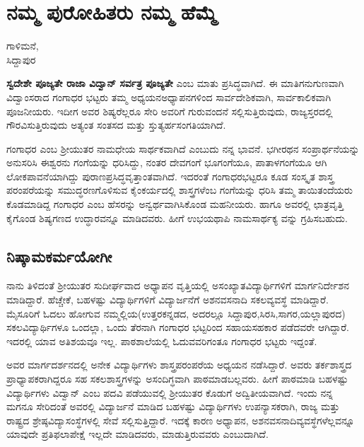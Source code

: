 {\fontsize{14}{16}\selectfont
\chapter{ನಮ್ಮ ಪುರೋಹಿತರು   \enginline{-}   ನಮ್ಮ ಹೆಮ್ಮೆ}

\begin{center}
\smallskip

ಗಾಳಿಮನೆ,\\ 
ಸಿದ್ದಾಪುರ	
\addrule
\end{center}

\textbf{ಸ್ವದೇಶೇ ಪೂಜ್ಯತೇ ರಾಜಾ ವಿದ್ವಾನ್ ಸರ್ವತ್ರ ಪೂಜ್ಯತೇ} ಎಂಬ ಮಾತು ಪ್ರಸಿದ್ಧ\-ವಾಗಿದೆ. ಈ ಮಾತಿಗನುಗುಣವಾಗಿ ವಿದ್ವಾಂಸರಾದ ಗಂಗಾಧರ ಭಟ್ಟರು ತಮ್ಮ ಅಧ್ಯಯನ\enginline{-}ಅಧ್ಯಾಪನಗಳಿಂದ ಸಾರ್ವದೇಶಿಕವಾಗಿ, ಸಾರ್ವಕಾಲಿಕವಾಗಿ ಪೂಜನೀಯರು. ಇದೀಗ ಅವರ ಶಿಷ್ಯರೆಲ್ಲರೂ ಸೇರಿ ಅವರಿಗೆ ಗುರುವಂದನೆ ಸಲ್ಲಿಸುತ್ತಿರುವುದು, ರಾಜ್ಯ\-ಸ್ತರದಲ್ಲಿ ಗೌರವಿಸುತ್ತಿರುವುದು ಅತ್ಯಂತ ಸಂತಸದ ಮತ್ತು ಸ್ತುತ್ಯರ್ಹಸಂಗತಿಯಾಗಿದೆ. 

ಗಂಗಾಧರ ಎಂಬ ಶ್ರೀಯುತರ ನಾಮಧೇಯ ಸಾರ್ಥಕವಾಗಿದೆ ಎಂಬುದು ನನ್ನ ಭಾವನೆ. ಭಗೀರಥನ ಸಂಪ್ರಾರ್ಥನೆಯನ್ನು ಅನುಸರಿಸಿ ಈಶ್ವರನು ಗಂಗೆಯನ್ನು ಧರಿಸಿದ್ದು, ನಂತರ  ದೇವಗಂಗೆ ಭೂಗಂಗೆಯೂ, ಪಾತಾಳಗಂಗೆಯೂ ಆಗಿ ಲೋಕಪಾವನೆ\-ಯಾಗಿದ್ದು ಪುರಾಣಪ್ರಸಿದ್ಧವೃತ್ತಾಂತವಾಗಿದೆ. ಇದರಂತೆ ಗಂಗಾಧರಭಟ್ಟರೂ ಕೂಡ ಸಂಸ್ಕೃತ  \enginline{-}  ಶಾಸ್ತ್ರ ಪರಂಪರೆಯನ್ನು ಸಮುದ್ಧರಣಗೊಳಿಸುವ ಕೈಂಕರ್ಯದಲ್ಲಿ ಶಾಸ್ತ್ರಗಳೆಂಬ ಗಂಗೆಯನ್ನು ಧರಿಸಿ ತಮ್ಮ ತಾಯಿ\enginline{-}ತಂದೆಯರು ಕೊಡಮಾಡಿದ್ದ ಗಂಗಾಧರ ಎಂಬ ಹೆಸರನ್ನು ಅನ್ವರ್ಥವಾಗಿಸಿಕೊಂಡ ಮಹನೀಯರು. ಹಾಗೂ ಅವರಲ್ಲಿ ಛಾತ್ರವೃತ್ತಿ ಕೈಗೊಂಡ ಶಿಷ್ಯಗಣದ ಉದ್ಧಾರವನ್ನೂ ಮಾಡಿದವರು. ಹೀಗೆ ಉಭಯಥಾಪಿ ನಾಮ\-ಸಾರ್ಥಕ್ಯ ವನ್ನು ಗ್ರಹಿಸಬಹುದು. 

\section*{ನಿಷ್ಕಾಮಕರ್ಮಯೋಗೀ} 

ನಾನು ತಿಳಿದಂತೆ ಶ್ರೀಯುತರ ಸುದೀರ್ಘವಾದ ಅಧ್ಯಾಪನ ವೃತ್ತಿಯಲ್ಲಿ ಅಸಂಖ್ಯಾತ\-ವಿದ್ಯಾರ್ಥಿಗಳಿಗೆ ಮಾರ್ಗನಿರ್ದೇಶನ ಮಾಡಿದ್ದಾರೆ. ಹೆಚ್ಚೇಕೆ, ಬಹಳಷ್ಟು ವಿದ್ಯಾರ್ಥಿ\-ಗಳಿಗೆ ವಿದ್ಯಾರ್ಜನೆಗೆ ಅಶನ\enginline{-}ವಸನಾದಿ ಸಕಲವ್ಯವಸ್ಥೆ ಮಾಡಿದ್ದಾರೆ. ಮೈಸೂರಿಗೆ ಓದಲು ಹೋಗುವ ನಮ್ಮಲ್ಲಿಯ(ಉತ್ತರಕನ್ನಡದ, ಅದರಲ್ಲೂ ಸಿದ್ದಾಪುರ,ಸಿರಸಿ,ಸಾಗರ,ಯಲ್ಲಾ\-ಪುರದ) ಸಕಲವಿದ್ಯಾರ್ಥಿಗಳೂ ಒಂದಲ್ಲಾ, ಒಂದು ತೆರನಾಗಿ ಗಂಗಾಧರ ಭಟ್ಟರಿಂದ ಸಹಾಯ\enginline{-}ಸಹಕಾರ ಪಡೆದವರೇ ಆಗಿದ್ದಾರೆ. ಇದರಲ್ಲಿ ಯಾವ ಅತಿಶಯವೂ ಇಲ್ಲ. ಪಾಠಶಾಲೆಯಲ್ಲಿ ಓದುವವರಿಗಂತೂ ಗಂಗಾಧರ ಭಟ್ಟರು  ಇದ್ದಂತೆ.  

ಅವರ ಮಾರ್ಗದರ್ಶನದಲ್ಲಿ ಅನೇಕ ವಿದ್ಯಾರ್ಥಿಗಳು ಶಾಸ್ತ್ರಪರಂಪರೆಯ ಅಧ್ಯಯನ ನಡೆಸಿದ್ದಾರೆ. ಅವರು ತರ್ಕಶಾಸ್ತ್ರದ ಪ್ರಾಧ್ಯಾಪಕರಾಗಿದ್ದರೂ ಸಹ ಸಕಲ\-ಶಾಸ್ತ್ರ\-ಗಳನ್ನು ಅಸಂದಿಗ್ಧವಾಗಿ  ಪಾಠಮಾಡಬಲ್ಲವರು. ಹೀಗೆ ಪಾಠಮಾಡಿ ಬಹಳಷ್ಟು ವಿದ್ಯಾರ್ಥಿ\-ಗಳು ವಿದ್ವಾನ್ ಎಂಬ ಪದವಿ ಪಡೆಯುವಲ್ಲಿ ಶ್ರೀಯುತರ ಕೊಡುಗೆ ಅದ್ವಿತೀಯವಾಗಿದೆ. ಇಂದು ನನ್ನ ಮಗನೂ ಸೇರಿದಂತೆ ಅವರಲ್ಲಿ ವಿದ್ಯಾರ್ಜನೆ ಮಾಡಿದ ಬಹಳಷ್ಟು ವಿದ್ಯಾರ್ಥಿಗಳು ಉಪನ್ಯಾಸಕರಾಗಿ,  ರಾಜ್ಯ ಮತ್ತು ರಾಷ್ಟ್ರದ ಶ್ರೇಷ್ಠವಿದ್ಯಾಸಂಸ್ಥೆಗಳಲ್ಲಿ ಸೇವೆ ಸಲ್ಲಿಸುತ್ತಿದ್ದಾರೆ. ಇದಕ್ಕೆ ಕಾರಣ ಅಧ್ಯಾಪನ, ಅಶನ\enginline{-}ವಸನಾದಿವ್ಯವಸ್ಥೆಗಳೆಲ್ಲವನ್ನೂ ಯಾವುದೇ ಪ್ರತಿಫಲಾಪೇಕ್ಷೆ ಇಲ್ಲದೇ ಮಾಡಿದವರು, ಮಾಡುತ್ತಿರುವವರು ಎಂಬುದಾಗಿದೆ. 

}
